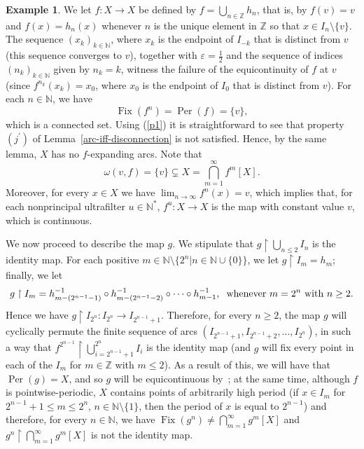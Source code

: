 \documentclass[12pt]{amsart}
\theoremstyle{definition}
\newtheorem{example}[theorem]{Example}
\numberwithin{equation}{section}
\DeclareMathOperator{\fix}{Fix}
\DeclareMathOperator{\per}{Per}
\begin{document}
\begin{example}
We let $f \colon X\longrightarrow X$ be defined by $f=\bigcup_{n\in\mathbb Z}h_n$, that is, by $f(v)=v$ and $f(x)=h_n(x)$ whenever $n$ is the unique element in $\mathbb Z$ so that $x\in I_n \setminus \{v\}$. The sequence 
$(x_k)_{k\in\mathbb N}$, where $x_k$ is the endpoint of $I_{-k}$ that is distinct from $v$ (this sequence converges to 
$v$), together with $\varepsilon= \frac{1}{2}$ and the sequence of indices $(n_k)_{k\in\mathbb N}$ given by 
$n_k=k$, witness the failure of the equicontinuity of $f$ at $v$ (since $f^{n_k}(x_k)=x_0$, where $x_0$ is the endpoint of $I_0$ that is distinct from $v$). For each $n\in\mathbb N$, we have 
\begin{equation}\label{p1}
\fix(f^n)=\per(f)=\{v\},
\end{equation}
\noindent which is a connected set. Using (\ref{p1}) it is straightforward to see that property $(j^\prime)$ of
Lemma~\ref{arc-iff-disconnection} is not satisfied. Hence, by the same lemma, $X$ has no $f$-expanding arcs. 
Note that
$$
\omega(v,f) = \{v\} \subsetneq X =  \bigcap_{m=1}^\infty f^m[X].
$$
Moreover, for every $x\in X$ we have $\lim_{n\to\infty}f^n(x)=v$, which implies that, for each nonprincipal ultrafilter $u\in\mathbb N^*$, $f^u \colon X\longrightarrow X$ is the map with constant value $v$, which is continuous.

We now proceed to describe the map $g$. We stipulate that $g\upharpoonright\bigcup_{n\leq 2}I_n$ is the 
identity map. For each positive $m\in\mathbb N\setminus\{2^n\big|n\in\mathbb N\cup\{0\}\}$, we let $g\upharpoonright I_m=h_m$; finally, we let 
$$
g\upharpoonright I_m=h_{m-(2^{n-1}-1)}^{-1}\circ h_{m-(2^{n-1}-2)}^{-1}\circ\cdots\circ h_{m-1}^{-1},
\hspace{.2cm} \mbox{whenever } m=2^n \mbox{ with } n\geq 2.
$$ 
Hence we have $g\upharpoonright I_{2^n}:I_{2^n}\longrightarrow I_{2^{n-1}+1}$. Therefore, for every $n\geq 2$, 
the map $g$ will cyclically permute the finite sequence of arcs $(I_{2^{n-1}+1},I_{2^{n-1}+2},\ldots,I_{2^n})$, in such a way that $f^{2^{n-1}}\upharpoonright\bigcup_{i=2^{n-1}+1}^{2^n}I_i$ is the identity map (and $g$ will fix every point in each of the $I_m$ for $m\in\mathbb Z$ with $m\leq 2$). As a result of this, we will have that 
$\per(g)=X$, and so $g$ will be equicontinuous by~\cite[Theorem~4.14]{camargo-rincon-uzcategui}; at the same 
time, although $f$ is pointwise-periodic, $X$ contains points of arbitrarily high period (if $x\in I_m$ 
for $2^{n-1}+1\leq m\leq 2^n$, $n\in\mathbb N\setminus\{1\}$, then the period of $x$ is equal to $2^{n-1}$) and therefore, for every $n\in\mathbb N$, we have $\fix(g^n)\neq\bigcap_{m=1}^\infty g^m[X]$ and $g^n\upharpoonright\bigcap_{m=1}^\infty g^m[X]$ is not the identity map.
\end{example}
\end{document}
